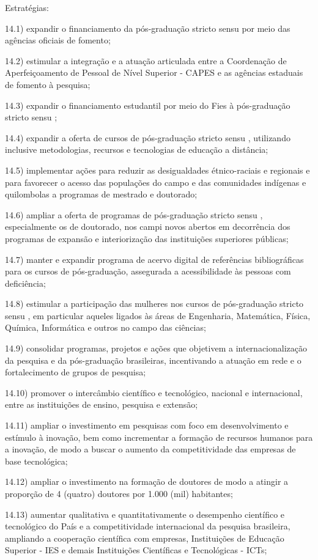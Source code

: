 \documentclass[
]{book}
\begin{document}
Estratégias:

14.1) expandir o financiamento da pós-graduação stricto sensu por meio das agências oficiais de fomento;

14.2) estimular a integração e a atuação articulada entre a Coordenação de Aperfeiçoamento de Pessoal de Nível Superior - CAPES e as agências estaduais de fomento à pesquisa;

14.3) expandir o financiamento estudantil por meio do Fies à pós-graduação stricto sensu ;

14.4) expandir a oferta de cursos de pós-graduação stricto sensu , utilizando inclusive metodologias, recursos e tecnologias de educação a distância;

14.5) implementar ações para reduzir as desigualdades étnico-raciais e regionais e para favorecer o acesso das populações do campo e das comunidades indígenas e quilombolas a programas de mestrado e doutorado;

14.6) ampliar a oferta de programas de pós-graduação stricto sensu , especialmente os de doutorado, nos campi novos abertos em decorrência dos programas de expansão e interiorização das instituições superiores públicas;

14.7) manter e expandir programa de acervo digital de referências bibliográficas para os cursos de pós-graduação, assegurada a acessibilidade às pessoas com deficiência;

14.8) estimular a participação das mulheres nos cursos de pós-graduação stricto sensu , em particular aqueles ligados às áreas de Engenharia, Matemática, Física, Química, Informática e outros no campo das ciências;

14.9) consolidar programas, projetos e ações que objetivem a internacionalização da pesquisa e da pós-graduação brasileiras, incentivando a atuação em rede e o fortalecimento de grupos de pesquisa;

14.10) promover o intercâmbio científico e tecnológico, nacional e internacional, entre as instituições de ensino, pesquisa e extensão;

14.11) ampliar o investimento em pesquisas com foco em desenvolvimento e estímulo à inovação, bem como incrementar a formação de recursos humanos para a inovação, de modo a buscar o aumento da competitividade das empresas de base tecnológica;

14.12) ampliar o investimento na formação de doutores de modo a atingir a proporção de 4 (quatro) doutores por 1.000 (mil) habitantes;

14.13) aumentar qualitativa e quantitativamente o desempenho científico e tecnológico do País e a competitividade internacional da pesquisa brasileira, ampliando a cooperação científica com empresas, Instituições de Educação Superior - IES e demais Instituições Científicas e Tecnológicas - ICTs;
\end{document}
